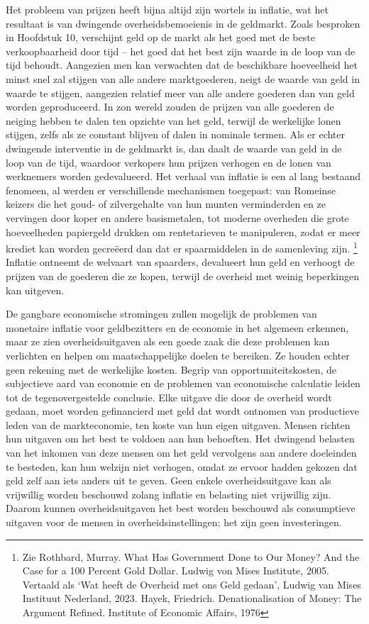 \documentclass[
  a5paper,
  smalldemyvopaper,11pt,twoside,onecolumn,openright,extrafontsizes,
hidelinks]{memoir}
\begin{document}
Het probleem van prijzen heeft bijna altijd zijn wortels in inflatie,
wat het resultaat is van dwingende overheidsbemoeienis in de geldmarkt.
Zoals besproken in Hoofdstuk 10, verschijnt geld op de markt als het
goed met de beste verkoopbaarheid door tijd -- het goed dat het best
zijn waarde in de loop van de tijd behoudt. Aangezien men kan verwachten
dat de beschikbare hoeveelheid het minst snel zal stijgen van alle
andere marktgoederen, neigt de waarde van geld in waarde te stijgen,
aangezien relatief meer van alle andere goederen dan van geld worden
geproduceerd. In zon wereld zouden de prijzen van alle goederen de
neiging hebben te dalen ten opzichte van het geld, terwijl de werkelijke
lonen stijgen, zelfs als ze constant blijven of dalen in nominale
termen. Als er echter dwingende interventie in de geldmarkt is, dan
daalt de waarde van geld in de loop van de tijd, waardoor verkopers hun
prijzen verhogen en de lonen van werknemers worden gedevalueerd. Het
verhaal van inflatie is een al lang bestaand fenomeen, al werden er
verschillende mechanismen toegepast: van Romeinse keizers die het goud-
of zilvergehalte van hun munten verminderden en ze vervingen door koper
en andere basismetalen, tot moderne overheden die grote hoeveelheden
papiergeld drukken om rentetarieven te manipuleren, zodat er meer
krediet kan worden gecreëerd dan dat er spaarmiddelen in de samenleving
zijn. \footnote{Zie Rothbard, Murray. What Has Government Done to Our
  Money? And the Case for a 100 Percent Gold Dollar. Ludwig von Mises
  Institute, 2005. Vertaald als `Wat heeft de Overheid met ons Geld
  gedaan', Ludwig van Mises Instituut Nederland, 2023. Hayek, Friedrich.
  Denationalisation of Money: The Argument Refined. Institute of
  Economic Affairs, 1976} Inflatie ontneemt de welvaart van spaarders,
devalueert hun geld en verhoogt de prijzen van de goederen die ze kopen,
terwijl de overheid met weinig beperkingen kan uitgeven.

De gangbare economische stromingen zullen mogelijk de problemen van
monetaire inflatie voor geldbezitters en de economie in het algemeen
erkennen, maar ze zien overheidsuitgaven als een goede zaak die deze
problemen kan verlichten en helpen om maatschappelijke doelen te
bereiken. Ze houden echter geen rekening met de werkelijke kosten.
Begrip van opportuniteitskosten, de subjectieve aard van economie en de
problemen van economische calculatie leiden tot de tegenovergestelde
conclusie. Elke uitgave die door de overheid wordt gedaan, moet worden
gefinancierd met geld dat wordt ontnomen van productieve leden van de
markteconomie, ten koste van hun eigen uitgaven. Mensen richten hun
uitgaven om het best te voldoen aan hun behoeften. Het dwingend belasten
van het inkomen van deze mensen om het geld vervolgens aan andere
doeleinden te besteden, kan hun welzijn niet verhogen, omdat ze ervoor
hadden gekozen dat geld zelf aan iets anders uit te geven. Geen enkele
overheidsuitgave kan als vrijwillig worden beschouwd zolang inflatie en
belasting niet vrijwillig zijn. Daarom kunnen overheidsuitgaven het best
worden beschouwd als consumptieve uitgaven voor de mensen in
overheidsinstellingen; het zijn geen investeringen.
\end{document}
